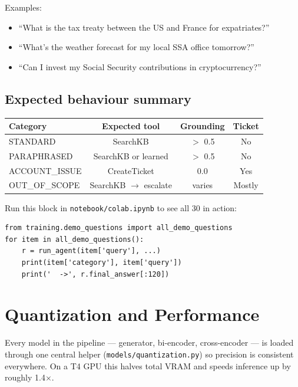 \documentclass[11pt,a4paper]{article}
\begin{document}
Examples:
\begin{itemize}[leftmargin=*, itemsep=0.5pt]
\item ``What is the tax treaty between the US and France for expatriates?''
\item ``What's the weather forecast for my local SSA office tomorrow?''
\item ``Can I invest my Social Security contributions in cryptocurrency?''
\end{itemize}

\subsection{Expected behaviour summary}

\begin{center}
\small
\begin{tabular}{@{}lccc@{}}
\toprule
Category       & Expected tool           & Grounding & Ticket \\
\midrule
STANDARD       & SearchKB                & $>$ 0.5   & No     \\
PARAPHRASED    & SearchKB or learned     & $>$ 0.5   & No     \\
ACCOUNT\_ISSUE & CreateTicket            & 0.0       & Yes    \\
OUT\_OF\_SCOPE & SearchKB $\to$ escalate & varies    & Mostly \\
\bottomrule
\end{tabular}
\end{center}

Run this block in \texttt{notebook/colab.ipynb} to see all 30 in action:

\begin{lstlisting}[basicstyle=\ttfamily\footnotesize]
from training.demo_questions import all_demo_questions
for item in all_demo_questions():
    r = run_agent(item['query'], ...)
    print(item['category'], item['query'])
    print('  ->', r.final_answer[:120])
\end{lstlisting}

\clearpage
\section{Quantization and Performance}

\begin{keyidea}
Every model in the pipeline --- generator, bi-encoder, cross-encoder --- is loaded through one central helper (\texttt{models/quantization.py}) so precision is consistent everywhere. On a T4 GPU this halves total VRAM and speeds inference up by roughly 1.4$\times$.
\end{keyidea}
\end{document}
